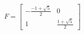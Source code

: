 \documentclass[preview]{standalone}
\begin{document}
\begin{center}
$$F = \begin{bmatrix} - \frac{-1 + \sqrt{5}}{2} &  0 \\ 1 & \frac{1 + \sqrt{5}}{2} \end{bmatrix}$$
\end{center}
\end{document}
